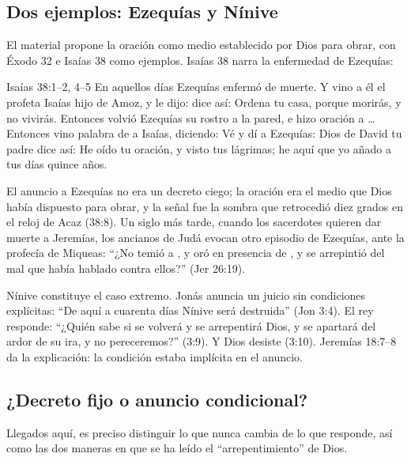 
\subsection{Dos ejemplos: Ezequías y Nínive}
El material propone la oración como medio establecido por Dios para obrar, con Éxodo 32 e Isaías 38 como ejemplos. Isaías 38 narra la enfermedad de Ezequías:

\begin{verso}{Isaías 38:1–2, 4–5}
En aquellos días Ezequías enfermó de muerte. Y vino a él el profeta Isaías hijo de Amoz, y le dijo: \SENOR{} dice así: Ordena tu casa, porque morirás, y no vivirás. Entonces volvió Ezequías su rostro a la pared, e hizo oración a \SENOR\ldots{} Entonces vino palabra de \SENOR{} a Isaías, diciendo: Vé y dí a Ezequías: \SENOR{} Dios de David tu padre dice así: He oído tu oración, y visto tus lágrimas; he aquí que yo añado a tus días quince años.
\end{verso}

El anuncio a Ezequías no era un decreto ciego; la oración era el medio que Dios había dispuesto para obrar, y la señal fue la sombra que retrocedió diez grados en el reloj de Acaz (38:8). Un siglo más tarde, cuando los sacerdotes quieren dar muerte a Jeremías, los ancianos de Judá evocan otro episodio de Ezequías, ante la profecía de Miqueas: ``¿No temió a \SENOR, y oró en presencia de \SENOR, y \SENOR{} se arrepintió del mal que había hablado contra ellos?'' (Jer 26:19).

Nínive constituye el caso extremo. Jonás anuncia un juicio sin condiciones explícitas: ``De aquí a cuarenta días Nínive será destruida'' (Jon 3:4). El rey responde: ``¿Quién sabe si se volverá y se arrepentirá Dios, y se apartará del ardor de su ira, y no pereceremos?'' (3:9). Y Dios desiste (3:10). Jeremías 18:7--8 da la explicación: la condición estaba implícita en el anuncio.

\subsection{¿Decreto fijo o anuncio condicional?}
Llegados aquí, es preciso distinguir lo que nunca cambia de lo que responde, así como las dos maneras en que se ha leído el ``arrepentimiento'' de Dios.

